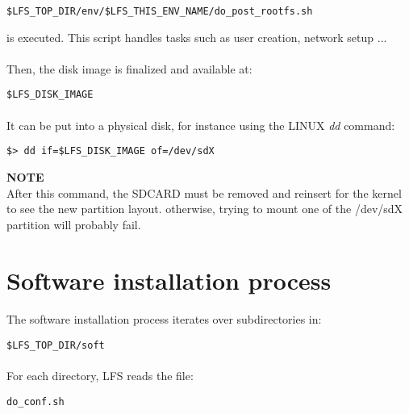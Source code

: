 \documentclass[a4paper, 11pt]{article}
\begin{document}
\begin{lstlisting}[frame=tb]
$LFS_TOP_DIR/env/$LFS_THIS_ENV_NAME/do_post_rootfs.sh
\end{lstlisting}
is executed. This script handles tasks such as user creation, network setup ...

\paragraph{}
Then, the disk image is finalized and available at:\\

\begin{lstlisting}[frame=tb]
$LFS_DISK_IMAGE
\end{lstlisting}

\paragraph{}
It can be put into a physical disk, for instance using the LINUX \textit{dd}
command:\\

\begin{lstlisting}[frame=tb]
$> dd if=$LFS_DISK_IMAGE of=/dev/sdX
\end{lstlisting}
\textbf{NOTE}\\
After this command, the SDCARD must be removed and reinsert for the kernel to
see the new partition layout. otherwise, trying to mount one of the /dev/sdX
partition will probably fail.


\clearpage
\section{Software installation process}
\paragraph{}
The software installation process iterates over subdirectories in:\\

\begin{lstlisting}[frame=tb]
$LFS_TOP_DIR/soft
\end{lstlisting}

\paragraph{}
For each directory, LFS reads the file:\\

\begin{lstlisting}[frame=tb]
do_conf.sh
\end{lstlisting}
\end{document}
